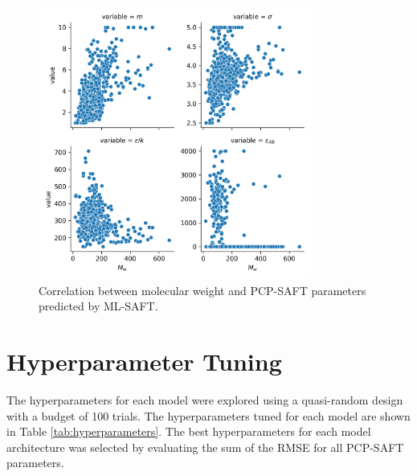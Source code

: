 \begin{figure}
    \centering
    \includegraphics[width=0.8\textwidth]{gfx/Chapter08/mw_pcsaft_parameter_correlation.png}
    \caption{Correlation between molecular weight and PCP-SAFT parameters predicted by ML-SAFT.}
    \label{fig:molecular_weight}
\end{figure}

\section{Hyperparameter Tuning}

The hyperparameters for each model were explored using a quasi-random design \cite{Bosquet2017} with a budget of 100 trials. The hyperparameters tuned for each model are shown in Table \ref{tab:hyperparameters}. The best hyperparameters for each model architecture was selected by evaluating the sum of the RMSE for all PCP-SAFT parameters.

